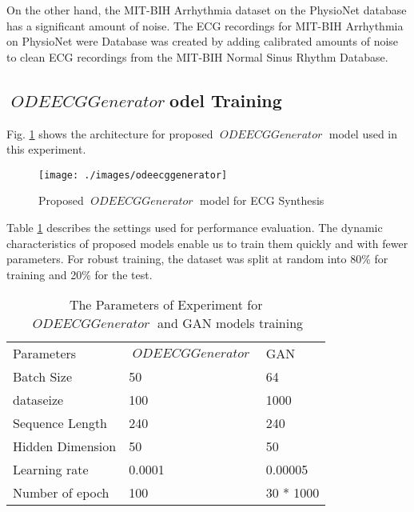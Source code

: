 \documentclass{article}
\DeclareMathOperator{\ODEECGGenerator}{\textit{ODEECGGenerator}}
\begin{document}
\begin{figure*}[http]
\hfill
{}\label{norm-first}
\hfill
{}\label{norm-second}
\vfill
{}\label{arrhythmia-first}
\hfill
{}\label{arrhythmia-second}
\caption{Configuration for neural network used in Human activity experiment}
\label{fig:dataset}
\end{figure*}

On the other hand, the MIT-BIH Arrhythmia dataset on the PhysioNet database has a significant amount of noise. The ECG recordings for MIT-BIH Arrhythmia on PhysioNet were Database was created by adding calibrated amounts of noise to clean ECG recordings from the MIT-BIH Normal Sinus Rhythm Database.

\subsection{\texorpdfstring{$\ODEECGGenerator$} model Training}
Fig. \ref{fig:model_ode} shows the architecture for proposed $\ODEECGGenerator$ model used in this experiment. 
\begin{figure}[htb]
    \centering
    \texttt{[image: ./images/odeecggenerator]}
    \caption{Proposed $\ODEECGGenerator$ model for ECG Synthesis}
    \label{fig:model_ode}
\end{figure}


Table \ref{tab:modela} describes the settings used for performance evaluation. The dynamic characteristics of proposed models enable us to train them quickly and with fewer parameters. For robust training, the dataset was split at random into  80\% for training and 20\% for the test.

\begin{table}[htb]
	\caption{The Parameters of Experiment for $\ODEECGGenerator$ and GAN models training}
	\centering
	\begin{tabular}{lll}
		\toprule
		Parameters & $\ODEECGGenerator$ & GAN \\
		Batch Size     &  50  & 64  \\
		dataseize & 100 & 1000\\
		Sequence Length & 240  & 240  \\
		Hidden Dimension     & 50  & 50  \\	
		Learning rate    & 0.0001  & 0.00005  \\
		Number of epoch    & 100  & 30 * 1000 \\
		\bottomrule
	\end{tabular}
	\label{tab:modela}
\end{table}
\end{document}
